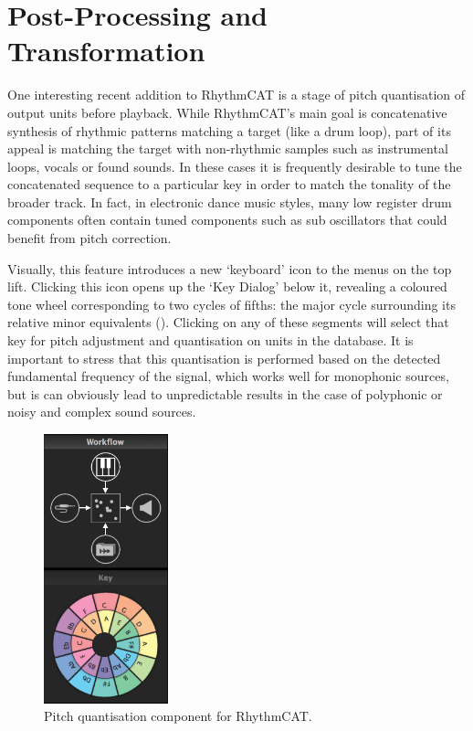 \section{Post-Processing and Transformation}

One interesting recent addition to RhythmCAT is a stage of pitch quantisation of output units before playback. While RhythmCAT’s main goal is concatenative synthesis of rhythmic patterns matching a target (like a drum loop), part of its appeal is matching the target with non-rhythmic samples such as instrumental loops, vocals or found sounds. In these cases it is frequently desirable to tune the concatenated sequence to a particular key in order to match the tonality of the broader track. In fact, in electronic dance music styles, many low register drum components often contain tuned components such as sub oscillators that could benefit from pitch correction.

Visually, this feature introduces a new `keyboard' icon to the menus on the top lift. Clicking this icon opens up the `Key Dialog' below it, revealing a coloured tone wheel corresponding to two cycles of fifths: the major cycle surrounding its relative minor equivalents (). Clicking on any of these segments will select that key for pitch adjustment and quantisation on units in the database. It is important to stress that this quantisation is performed based on the detected fundamental frequency of the signal, which works well for monophonic sources, but is can obviously lead to unpredictable results in the case of polyphonic or noisy and complex sound sources.

\begin{figure}
	\begin{center}
		\includegraphics[width=0.32\textwidth]{ch06_rhythmcat/figures/tonewheel.png}
	\end{center}
	\caption[Pitch quantisation component for RhythmCAT]{Pitch quantisation component for RhythmCAT.}
	\label{fig:rhythmcat_pitch}
\end{figure} 

